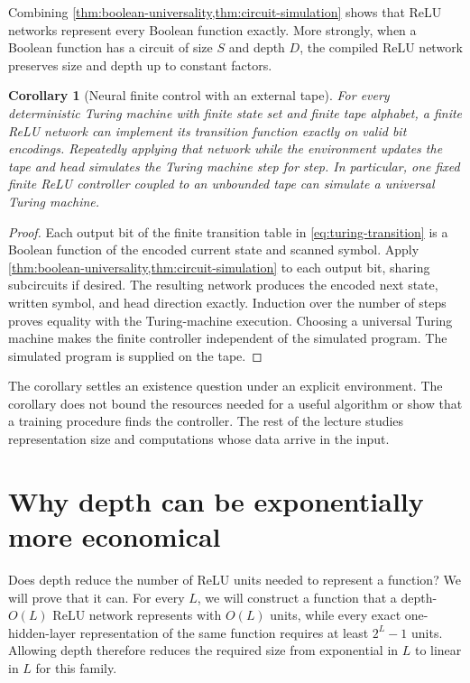\documentclass[11pt,twoside]{article}
\newtheorem{corollary}[theorem]{Corollary}
\theoremstyle{definition}
\theoremstyle{remark}
\begin{document}
Combining \cref{thm:boolean-universality,thm:circuit-simulation} shows that
ReLU networks represent every Boolean function exactly. More strongly, when
a Boolean function has a circuit of size $S$ and depth $D$, the compiled
ReLU network preserves size and depth up to constant factors.

\begin{corollary}[Neural finite control with an external tape]
\label{cor:neural-turing-control}
For every deterministic Turing machine with finite state set and finite tape
alphabet, a finite ReLU network can implement its transition function exactly
on valid bit encodings. Repeatedly applying that network while the environment
updates the tape and head simulates the Turing machine step for step. In
particular, one fixed finite ReLU controller coupled to an unbounded tape can
simulate a universal Turing machine.
\end{corollary}

\begin{proof}
Each output bit of the finite transition table in
\cref{eq:turing-transition} is a Boolean function of the encoded current
state and scanned symbol. Apply
\cref{thm:boolean-universality,thm:circuit-simulation} to each output bit,
sharing subcircuits if desired. The resulting network produces the encoded
next state, written symbol, and head direction exactly. Induction over the
number of steps proves equality with the Turing-machine execution. Choosing a
universal Turing machine makes the finite controller independent of the
simulated program. The simulated program is supplied on the tape.
\end{proof}

The corollary settles an existence question under an explicit environment.
The corollary does not bound the resources needed for a useful algorithm or
show that a training procedure finds the controller. The rest of the lecture
studies representation size and computations whose data arrive in the input.

\section{Why depth can be exponentially more economical}
\label{sec:tent}

Does depth reduce the number of ReLU units needed to represent a function?
We will prove that it can. For every $L$, we will construct a function that a
depth-$O(L)$ ReLU network represents with $O(L)$ units, while every exact
one-hidden-layer representation of the same function requires at least
$2^L-1$ units. Allowing depth therefore reduces the required size from
exponential in $L$ to linear in $L$ for this family.
\end{document}
